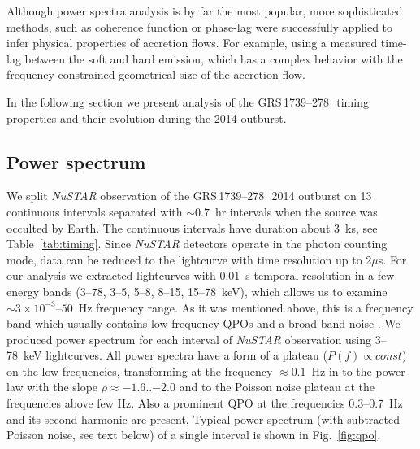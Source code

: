 \documentclass[a4paper,fleqn,usenatbib]{mnras}
\def\grs{{GRS\,1739--278\,}}
\begin{document}
Although power spectra analysis is by far the most popular, more sophisticated methods, such as coherence function or phase-lag were successfully applied to infer physical properties of accretion flows. 
For example, using a measured time-lag between the soft and hard emission, which has a complex behavior with the frequency \citet{1999ApJ...517..355N} constrained geometrical size of the accretion flow. 


In the following section we present analysis of the \grs\ timing properties and their evolution during the 2014 outburst.

\subsection{Power spectrum}

We split {\it NuSTAR} observation of the \grs\ 2014 outburst on 13 continuous intervals separated with $\sim0.7$~hr intervals when the source was occulted by Earth. 
The continuous intervals have duration about 3~ks, see Table~\ref{tab:timing}.
Since {\it NuSTAR} detectors operate in the photon counting mode, data can be reduced to the lightcurve with time resolution up to 2$\mu$s.
For our analysis we extracted lightcurves with 0.01~s temporal resolution in a few energy bands (3--78, 3--5, 5--8, 8--15, 15--78~keV), which allows us to examine $\sim3\times10^{-3}$--$50$~Hz frequency range.
As it was mentioned above, this is a frequency band which usually contains low frequency QPOs and a broad band noise \citep{wijnands99}.
We produced power spectrum for each interval of {\it NuSTAR} observation using 3--78~keV lightcurves.
All power spectra have a form of a plateau ($P(f)\propto const$) on the low frequencies, transforming at the frequency $\approx0.1$~Hz in to the power law with the slope $\rho\approx-1.6$..$-2.0$ and to the Poisson noise plateau at the frequencies above few Hz. 
Also a prominent QPO at the frequencies 0.3--0.7~Hz and its second harmonic are present. 
Typical power spectrum (with subtracted Poisson noise, see text below) of a single interval is shown in Fig.~\ref{fig:qpo}.
\end{document}
